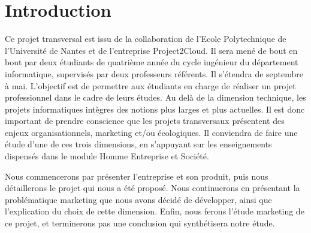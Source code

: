 

	
	\section{Introduction}
	Ce projet transversal est issu de la collaboration de l'Ecole Polytechnique de l'Université de Nantes et de l'entreprise Project2Cloud. Il sera mené de bout en bout par deux étudiants de quatrième année du cycle ingénieur du département informatique, supervisés par deux professeurs référents. Il s'étendra de septembre à mai. L'objectif est de permettre aux étudiants en charge de réaliser un projet professionnel dans le cadre de leurs études. Au delà de la dimension technique, les projets informatiques intègres des notions plus larges et plus actuelles. Il est donc important de prendre conscience que les projets transversaux présentent des enjeux organisationnels, marketing et/ou écologiques. Il conviendra de faire une étude d'une de ces trois dimensions, en s'appuyant sur les enseignements dispensés dans le module Homme Entreprise et Société. 
	
	Nous commencerons par présenter l'entreprise et son produit, puis nous détaillerons le projet qui nous a été proposé. Nous continuerons en présentant la problématique marketing que nous avons décidé de développer, ainsi que l'explication du choix de cette dimension. Enfin, nous ferons l'étude marketing de ce projet, et terminerons pas une conclusion qui synthétisera notre étude. 